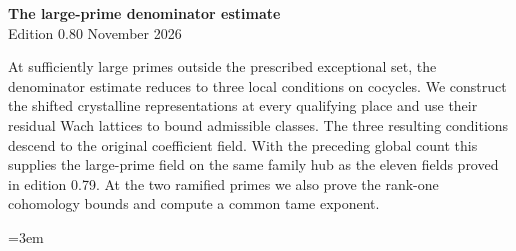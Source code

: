 \begin{center}
{\Large\bfseries The large-prime denominator estimate}\\[4pt]
Edition 0.80  November 2026
\end{center}

At sufficiently large primes outside the prescribed exceptional set, the
denominator estimate reduces to three local conditions on cocycles. We
construct the shifted crystalline representations at every qualifying
place and use their residual Wach lattices to bound admissible classes.
The three resulting conditions descend to the original coefficient
field. With the preceding global count this supplies the large-prime
field on the same family hub as the eleven fields proved in edition 0.79. At the two ramified primes we also prove the rank-one
cohomology bounds and compute a common tame exponent.

\begingroup\emergencystretch=3em








\endgroup
